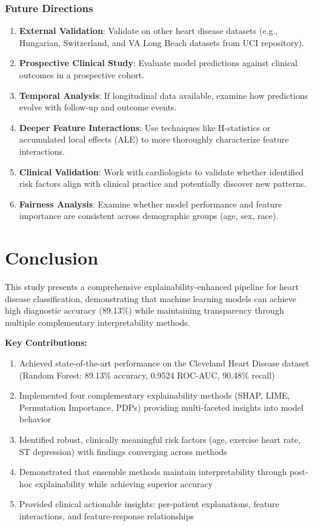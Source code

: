 \documentclass[journal]{IEEEtran}
\begin{document}
\subsubsection{Future Directions}

\begin{enumerate}
    \item \textbf{External Validation}: Validate on other heart disease datasets (e.g., Hungarian, Switzerland, and VA Long Beach datasets from UCI repository).
    \item \textbf{Prospective Clinical Study}: Evaluate model predictions against clinical outcomes in a prospective cohort.
    \item \textbf{Temporal Analysis}: If longitudinal data available, examine how predictions evolve with follow-up and outcome events.
    \item \textbf{Deeper Feature Interactions}: Use techniques like H-statistics or accumulated local effects (ALE) to more thoroughly characterize feature interactions.
    \item \textbf{Clinical Validation}: Work with cardiologists to validate whether identified risk factors align with clinical practice and potentially discover new patterns.
    \item \textbf{Fairness Analysis}: Examine whether model performance and feature importance are consistent across demographic groups (age, sex, race).
\end{enumerate}

\section{Conclusion}\label{sec:conclusion}

This study presents a comprehensive explainability-enhanced pipeline for heart disease classification, demonstrating that machine learning models can achieve high diagnostic accuracy (89.13\%) while maintaining transparency through multiple complementary interpretability methods.

\textbf{Key Contributions:}

\begin{enumerate}
    \item Achieved state-of-the-art performance on the Cleveland Heart Disease dataset (Random Forest: 89.13\% accuracy, 0.9524 ROC-AUC, 90.48\% recall)
    \item Implemented four complementary explainability methods (SHAP, LIME, Permutation Importance, PDPs) providing multi-faceted insights into model behavior
    \item Identified robust, clinically meaningful risk factors (age, exercise heart rate, ST depression) with findings converging across methods
    \item Demonstrated that ensemble methods maintain interpretability through post-hoc explainability while achieving superior accuracy
    \item Provided clinical actionable insights: per-patient explanations, feature interactions, and feature-response relationships
\end{enumerate}
\end{document}
